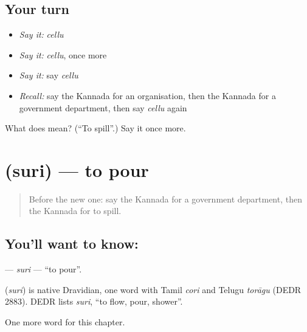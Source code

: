 \subsection*{Your turn}
\begin{itemize}
\raggedright
  \item \emph{Say it:} \emph{cellu}
  \item \emph{Say it:} \emph{cellu}, once more
  \item \emph{Say it:} say \emph{cellu}
  \item \emph{Recall:} say the Kannada for an organisation, then the Kannada for a government department, then say \emph{cellu} again
\end{itemize}

\begin{tcolorbox}[breakable,colback=teal!4,colframe=teal!35!black,title={Before you move on}]
What does  mean? (\textquotedblleft{}To spill\textquotedblright{}.) Say it once more.
\end{tcolorbox}
\section[\texorpdfstring{\kn{ಸುರಿ} (suri)}{ಸುರಿ (suri)}]{ (suri) — to pour}

\label{lesson:KA-C272-suri}



\begin{quote}
Before the new one: say the Kannada for a government department, then the Kannada for to spill.
\end{quote}

\subsection*{You'll want to know: }
\textbf{} — \emph{suri} — \textquotedblleft{}to pour\textquotedblright{}.

\begin{cousinweb}
\textbf{} (\emph{suri}) is native Dravidian, one word with Tamil \emph{cori} and Telugu \emph{torāgu} (DEDR 2883). DEDR lists \emph{suri}, \textquotedblleft{}to flow, pour, shower\textquotedblright{}.
\end{cousinweb}

\begin{grammarlens}[title={What you've built}]
One more word for this chapter.
\end{grammarlens}


